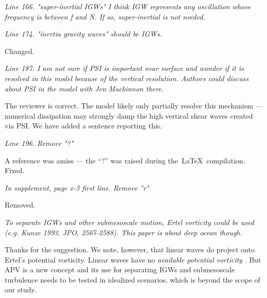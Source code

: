 \documentclass[11pt]{article}
\newcommand{\bdp}{\begin{description}}
\newcommand{\edp}{\end{description}}
\begin{document}
\begin{enumerate}

\item {\it Line 166. "super-inertial IGWs" I think IGW represents any oscillation whose
                frequency is between f and N. If so, super-inertial is not needed.}

\bdp
  \item  {}
\edp

\item {\it Line 174. "inertia gravity waves" should be IGWs.}

\bdp
   \item Changed.
\edp

\item {\it Line 187. I am not sure if PSI is important near surface and wonder if it
                is resolved in this model because of the vertical resolution.
                Authors could discuss about PSI in the model with Jen Mackinnon there.}

\bdp
  \item \noindent The reviewer is correct. The model likely only partially resolve
        this mechanism — numerical dissipation may strongly damp the high vertical
        shear waves created via PSI. We have added a sentence reporting this.
\edp

\item {\it Line 196. Remove "?"}

\bdp
  \item A reference  was amiss --- the ``?'' was raised during the\, \LaTeX\, compilation. Fixed.
\edp

\item {\it In supplement, page x-3 first line. Remove "r"}

\bdp
  \item Removed.
\edp

\item {\it To separate IGWs and other submesoscale motion, Ertel vorticity could be
      used (e.g. Kunze 1993, JPO, 2567-2588). This paper is about deep ocean though.}

      \bdp
        \item {\noindent Thanks for the suggestion. We note, however, that linear waves do
        project onto Ertel's potential vorticity. Linear waves have no \textit{available potential vorticity}
        \citep[APV, ][]{wagner_young2015}. But APV is a new concept and its use
        for separating IGWs and submesoscale turbulence needs to be tested in idealized
        scenarios, which is beyond the scope of our study.}
      \edp


\end{enumerate}
\end{document}
